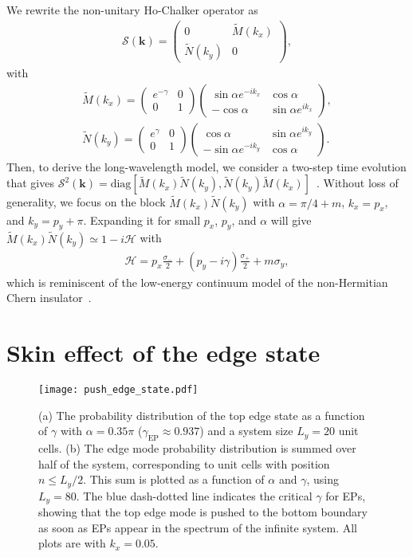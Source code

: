 \documentclass[aps,pra,reprint,superscriptaddress,showkeys,amsmath,amssymb,longbibliography]{revtex4-1}
\begin{document}
We rewrite the non-unitary Ho-Chalker operator as
\begin{eqnarray}
\mathcal{S}(\mathbf{k})=\begin{pmatrix}
0&\tilde{M}(k_x)\\
\tilde{N}(k_y)&0
\end{pmatrix},
\end{eqnarray}
with 
\begin{eqnarray}
\tilde{M}(k_x)=\begin{pmatrix}
e^{-\gamma}&0\\
0&1
\end{pmatrix}\begin{pmatrix}
\sin\alpha e^{-ik_x} & \cos\alpha\\
-\cos\alpha & \sin\alpha e^{ik_x}
\end{pmatrix},
              \\
\tilde{N}(k_y)=\begin{pmatrix}
e^{\gamma}&0\\
0&1
\end{pmatrix}\begin{pmatrix}
\cos\alpha & \sin\alpha e^{ik_y}\\
-\sin\alpha e^{-ik_y} & \cos\alpha
\end{pmatrix}.
\end{eqnarray}
Then, to derive the long-wavelength model, we consider a two-step time evolution that gives $\mathcal{S}^2(\mathbf{k})=\text{diag}[\tilde{M}(k_x)\tilde{N}(k_y),\tilde{N}(k_y)\tilde{M}(k_x)]$~\cite{Ho1996}.
Without loss of generality, we focus on the block $\tilde{M}(k_x)\tilde{N}(k_y)$ with $\alpha=\pi/4+m$, $k_x=p_x$, and $k_y=p_y+\pi$.
Expanding it for small $p_x$, $p_y$, and $\alpha$ will give $\tilde{M}(k_x)\tilde{N}(k_y)\simeq 1-i\mathcal{H}$ with
\begin{eqnarray}
\mathcal{H}=p_x\frac{\sigma_{-}}{2}+(p_y-i\gamma)\frac{\sigma_{+}}{2}+m\sigma_y,
\end{eqnarray}
which is reminiscent of the low-energy continuum model of the non-Hermitian Chern insulator~\cite{Yao2018a,Shen2018a}. 

\section{Skin effect of the edge state}
\label{app:se_es}

\begin{figure}
\centering
\texttt{[image: push\_edge\_state.pdf]}
\caption{(a) The probability distribution of the top edge state as a function of $\gamma$ with $\alpha=0.35\pi$ ($\gamma_{\text{EP}}\approx 0.937$) and a system size $L_y=20$ unit cells.
(b) The edge mode probability distribution is summed over half of the system, corresponding to unit cells with position $n\leq L_y/2$. This sum is plotted as a function of $\alpha$ and $\gamma$, using $L_y=80$. 
The blue dash-dotted line indicates the critical $\gamma$ for EPs, showing that the top edge mode is pushed to the bottom boundary as soon as EPs appear in the spectrum of the infinite system.
All plots are with $k_x=0.05$.
\label{fig: push_edge_state}}
\end{figure}
\end{document}
